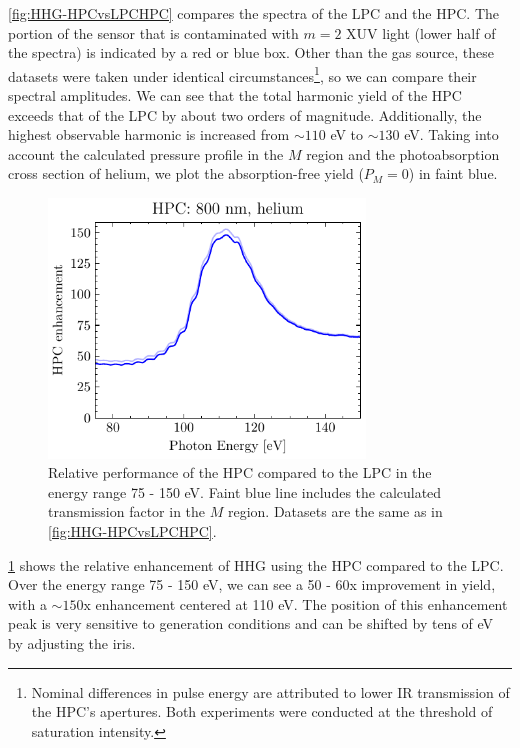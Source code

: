 \cref{fig:HHG-HPCvsLPCHPC} compares the spectra of the LPC and the HPC. The portion of the sensor that is contaminated with $m=2$ XUV light (lower half of the spectra) is indicated by a red or blue box. Other than the gas source, these datasets were taken under identical circumstances\footnote{Nominal differences in pulse energy are attributed to lower IR transmission of the HPC's apertures. Both experiments were conducted at the threshold of saturation intensity.}, so we can compare their spectral amplitudes. We can see that the total harmonic yield of the HPC exceeds that of the LPC by about two orders of magnitude. Additionally, the highest observable harmonic is increased from $\sim 110$ eV to $\sim 130$ eV.  Taking into account the calculated pressure profile in the $M$ region and the photoabsorption cross section of helium, we plot the absorption-free yield ($P_M =0$) in faint blue.

\begin{figure}
	\centering
	\includegraphics[width=0.75\textwidth]{figures/chap3/HPC_He800nm_enhancement.pdf}
	\caption{Relative performance of the HPC compared to the LPC in the energy range 75 - 150 eV. Faint blue line includes the calculated transmission factor in the $M$ region. Datasets are the same as in \cref{fig:HHG-HPCvsLPCHPC}.}
	\label{fig:HPC_He800nm_enhancement}
\end{figure}

\cref{fig:HPC_He800nm_enhancement} shows the relative enhancement of HHG using the HPC compared to the LPC. Over the energy range 75 - 150 eV, we can see a 50 - 60x improvement in yield, with a $\sim 150 \textrm{x}$ enhancement centered at 110 eV. The position of this enhancement peak is very sensitive to generation conditions and can be shifted by tens of eV by adjusting the iris.

